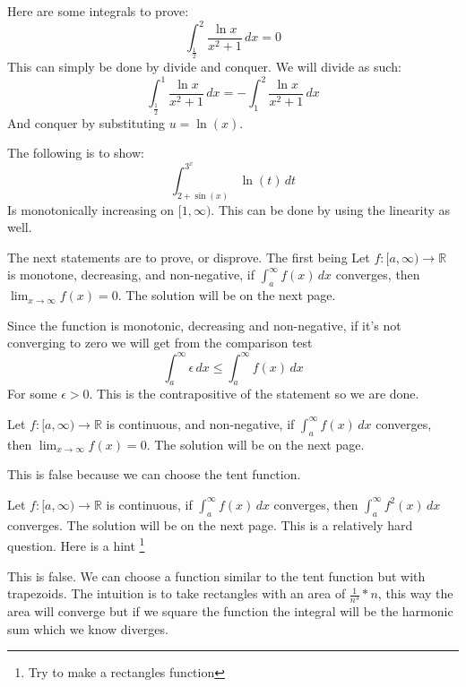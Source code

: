 \documentclass{article}
\theoremstyle{plain}
\newcommand{\R}{\mathbb{R}}
\begin{document}
	\newpage
	
	Here are some integrals to prove:
	\[
		\int_{\frac{1}{2}}^{2}{\frac{\ln x}{x^2+1}\,dx} = 0
	\]
	This can simply be done by divide and conquer. We will divide as such:
	\[
		\int_{\frac{1}{2}}^{1}{\frac{\ln x}{x^2+1}\,dx} = 
		-\int_{1}^{2}{\frac{\ln x}{x^2+1}\,dx}
	\]
	And conquer by substituting $u = \ln (x)$.
	
	\newpage
	
	The following is to show:
	\[
		\int_{2+\sin(x)}^{3^x}{\ln(t)\,dt}
	\]
	Is monotonically increasing on $[1,\infty)$. This can be done by using
	the linearity as well.
	
	\newpage
	
	The next statements are to prove, or disprove. The first being
	Let $f\colon[a,\infty)\to\R$ is monotone, decreasing, and non-negative,
	if $\int_{a}^{\infty}{f(x)\,dx}$ converges, then 
	$\lim_{x\to\infty}{f(x)} = 0$. The solution will be on the next page.
	
	\newpage
	
	Since the function is monotonic, decreasing and non-negative, 
	if it's not converging to zero we will get from the comparison test
	\[
		\int_{a}^{\infty}{\epsilon\,dx} \le \int_{a}^{\infty}{f(x)\,dx}
	\]
	For some $\epsilon > 0$. This is the contrapositive of the statement
	so we are done.
	
	\newpage
	
	Let $f\colon[a,\infty)\to\R$ is continuous, and non-negative,
	if $\int_{a}^{\infty}{f(x)\,dx}$ converges, then 
	$\lim_{x\to\infty}{f(x)} = 0$. The solution will be on the next page.
	
	\newpage
	
	This is false because we can choose the tent function.
	
	\newpage
	
	Let $f\colon[a,\infty)\to\R$ is continuous,
	if $\int_{a}^{\infty}{f(x)\,dx}$ converges, then 
	$\int_{a}^{\infty}{f^2(x)\,dx}$ converges. 
	The solution will be on the next page. This is a relatively hard question.
	Here is a hint \footnote{Try to make a rectangles function}

	\newpage
	
	This is false. We can choose a function similar to the tent function but
	with trapezoids. The intuition is to take rectangles with an area of 
	$\frac{1}{n^3} * n$, this way the area will converge but if we square
	the function the integral will be the harmonic sum which we know diverges.
	
	\newpage
	
\end{document}
